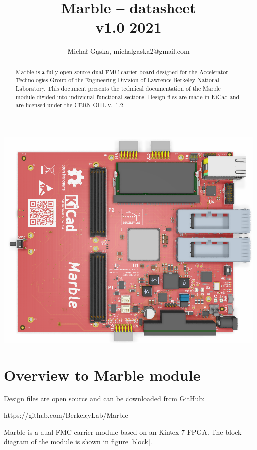 \documentclass[12pt,oneside,a4]{article}
\title{Marble -- datasheet\\ \small{v1.0 2021}}
\author{Michał Gąska, michalgaska2@gmail.com}
\begin{document}
\maketitle
\begin{center}
\includegraphics[width=0.8\linewidth]{marble_top.png}
\end{center}
\begin{abstract}
Marble is a fully open source dual FMC carrier board designed for the Accelerator Technologies Group of the Engineering Division of Lawrence Berkeley National Laboratory. This document presents the technical documentation of the Marble module divided into individual functional sections.
Design files are made in KiCad and are licensed under the CERN OHL v.~1.2.
\end{abstract}

\clearpage
\tableofcontents

\clearpage

\section{Overview to Marble module}

\begin{leftbar}
Design files are open source and can be downloaded from GitHub:

https://github.com/BerkeleyLab/Marble
\end{leftbar}

Marble is a dual FMC carrier module based on an Kintex-7 FPGA. The block diagram of the module is shown in figure \ref{block}.
\end{document}
